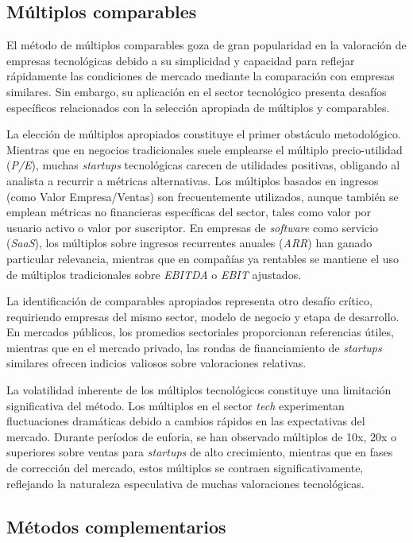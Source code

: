 \subsection{Múltiplos comparables}

El método de múltiplos comparables goza de gran popularidad en la valoración de empresas tecnológicas debido a su simplicidad y capacidad para reflejar rápidamente las condiciones de mercado mediante la comparación con empresas similares. Sin embargo, su aplicación en el sector tecnológico presenta desafíos específicos relacionados con la selección apropiada de múltiplos y comparables.

La elección de múltiplos apropiados constituye el primer obstáculo metodológico. Mientras que en negocios tradicionales suele emplearse el múltiplo precio-utilidad (\emph{P/E}), muchas \emph{startups} tecnológicas carecen de utilidades positivas, obligando al analista a recurrir a métricas alternativas. Los múltiplos basados en ingresos (como Valor Empresa/Ventas) son frecuentemente utilizados, aunque también se emplean métricas no financieras específicas del sector, tales como valor por usuario activo o valor por suscriptor. En empresas de \emph{software} como servicio (\emph{SaaS}), los múltiplos sobre ingresos recurrentes anuales (\emph{ARR}) han ganado particular relevancia, mientras que en compañías ya rentables se mantiene el uso de múltiplos tradicionales sobre \emph{EBITDA} o \emph{EBIT} ajustados.

La identificación de comparables apropiados representa otro desafío crítico, requiriendo empresas del mismo sector, modelo de negocio y etapa de desarrollo. En mercados públicos, los promedios sectoriales proporcionan referencias útiles, mientras que en el mercado privado, las rondas de financiamiento de \emph{startups} similares ofrecen indicios valiosos sobre valoraciones relativas.

La volatilidad inherente de los múltiplos tecnológicos constituye una limitación significativa del método. Los múltiplos en el sector \emph{tech} experimentan fluctuaciones dramáticas debido a cambios rápidos en las expectativas del mercado. Durante períodos de euforia, se han observado múltiplos de 10x, 20x o superiores sobre ventas para \emph{startups} de alto crecimiento, mientras que en fases de corrección del mercado, estos múltiplos se contraen significativamente, reflejando la naturaleza especulativa de muchas valoraciones tecnológicas.

\subsection{Métodos complementarios}


